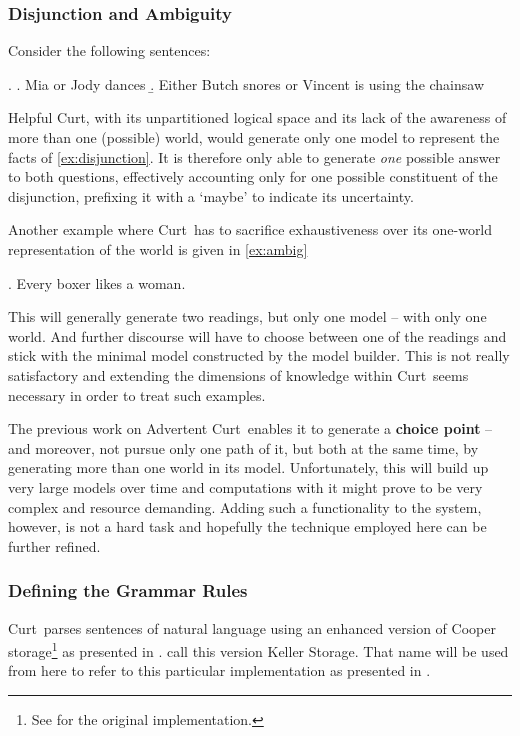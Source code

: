 \documentclass[12pt,a4paper]{article}
\newcommand{\term}[1]{\textsf{\textbf{#1}}} %
\newcommand{\pn}{\textsf} %
\newcommand{\curt}{\pn{Curt}\mbox{ }}
\newcommand{\acurt}{\pn{Advertent Curt}\mbox{ }}
\theoremstyle{remark} \newtheorem*{termin}{Terminology} %
\begin{document}
\subsubsection{Disjunction and Ambiguity}
Consider the following sentences:

\ex. \label{ex:disjunction} \a. Mia or Jody dances
\b. Either Butch snores or Vincent is using the chainsaw

\pn{Helpful Curt}, with its unpartitioned logical space and its lack of
the awareness of more than one (possible) world, would generate only one model
to represent the facts of \ref{ex:disjunction}. It is therefore only able to
generate \emph{one} possible answer to both questions, effectively accounting only
for one possible constituent of the disjunction, prefixing it with a `maybe' to
indicate its uncertainty.

Another example where \curt has to sacrifice exhaustiveness over its one-world
representation of the world is given in \ref{ex:ambig}

\ex.\label{ex:ambig} Every boxer likes a woman.

This will generally generate two readings, but only one model -- with only one
world. And further discourse will have to choose between one of the readings and
stick with the minimal model constructed by the model builder. This is not
really satisfactory and extending the dimensions of knowledge within \curt seems
necessary in order to treat such examples.

The previous work on \acurt enables it to generate a \term{choice point} -- and
moreover, not pursue only one path of it, but both at the same time, by
generating more than one world in its model.
Unfortunately, this will build up very large models over time and computations
with it might prove to be very complex and resource demanding. Adding such a
functionality to the system, however, is not a hard task and hopefully the
technique employed here can be further refined. %

\subsubsection{Defining the Grammar Rules}

\curt parses sentences of natural language using an enhanced version of \pn{Cooper
storage}\footnote{See \cite{cooper:storage2} for the original implementation.} as
presented in \cite{keller:storage}. \cite{blackburnbos:cl1} call this version
\pn{Keller Storage}. That name will be used from here %
to refer to this particular implementation as presented in
\cite{blackburnbos:cl1}. 
\end{document}
